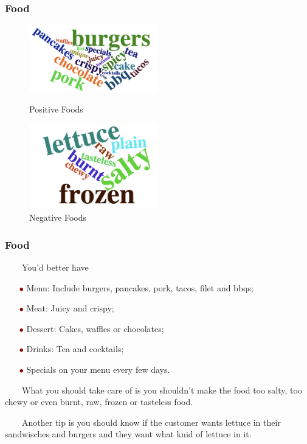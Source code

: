 \documentclass[notheorems, aspectratio=54]{beamer}
\renewcommand\textbullet{\ensuremath{\bullet}}
\begin{document}
\begin{frame}
\frametitle{Food}

\begin{figure}
	\begin{minipage}[t]{0.5\linewidth}
		\centering
		\includegraphics[width=2.2in]{food_good.png}
		\caption{Positive Foods}
		\label{fig:side:a}
	\end{minipage}%
	\begin{minipage}[t]{0.5\linewidth}
		\centering
		\includegraphics[width=2.2in]{food_bad.png}
		\caption{Negative Foods}
		\label{fig:side:b}
	\end{minipage}
\end{figure}
\end{frame}

\begin{frame}
\frametitle{Food}
\ \ \ \ You'd better have
\begin{itemize}
	\item[\textcolor{darkred}{\textbullet}] Menu: Include burgers, pancakes, pork, tacos, filet and bbqs;
	\item[\textcolor{darkred}{\textbullet}] Meat: Juicy and crispy;
	\item[\textcolor{darkred}{\textbullet}] Dessert: Cakes, waffles or chocolates;
	\item[\textcolor{darkred}{\textbullet}] Drinks: Tea and cocktails;
	\item[\textcolor{darkred}{\textbullet}] Specials on your menu every few days.
\end{itemize}
\vspace{2ex}

\ \ \ \ What you should take care of is you shouldn't make the food too salty, too chewy or even burnt, raw, frozen or tasteless food. 

\ \ \ \ Another tip is you should know if the customer wants lettuce in their sandwisches and burgers and they want what knid of lettuce in it.

\end{frame}
\end{document}
